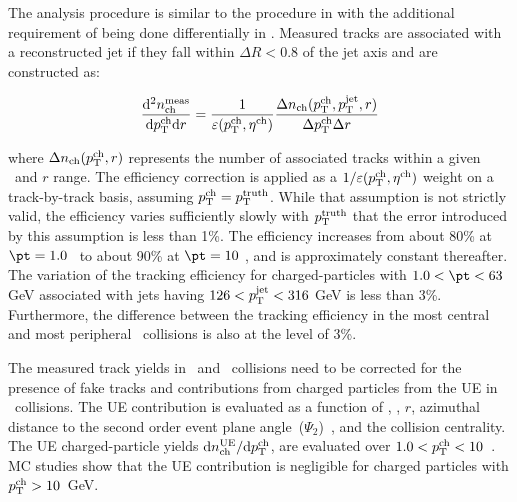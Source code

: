 
The analysis procedure is similar to the procedure in \cite{PhysRevC.98.024908} with the additional requirement of being done differentially in \rvar. Measured tracks are associated with a reconstructed jet if they fall within $\Delta R < 0.8$ of the jet axis and are constructed as:

\begin{eqnarray}
\dfrac{\mathrm{d}^{2} \mbox{$n_{\mathrm{ch}}^{\mathrm{meas}}$} }{ \mathrm{d} \mbox{$p_{\mathrm{T}}^{\mathrm{ch}}$} \mathrm{d} r} = \frac{1}{\varepsilon(\mbox{$p_{\mathrm{T}}^{\mathrm{ch}}$},\mbox{$\eta^{\mathrm{ch}}$})} \frac{\Delta \mbox{$n_{\mathrm{ch}}$}(\mbox{$p_{\mathrm{T}}^{\mathrm{ch}}$},\mbox{$p_{\mathrm{T}}^{\mathrm{jet}}$},r)}{\Delta\mbox{$p_{\mathrm{T}}^{\mathrm{ch}}$} \Delta r}
\end{eqnarray}

where $\Delta \mbox{$n_{\mathrm{ch}}$} (\mbox{$p_{\mathrm{T}}^{\mathrm{ch}}$},r)$ represents the number of associated tracks within a given \pttrk\ and $r$ range. The efficiency correction is applied as a $1/\varepsilon(\mbox{$p_{\mathrm{T}}^{\mathrm{ch}}$},\mbox{$\eta^{\mathrm{ch}}$})$ weight on a track-by-track basis, assuming $\mbox{$p_{\mathrm{T}}^{\mathrm{ch}}$} = \mbox{$p_{\mathrm{T}}^{\mathrm{truth}}$}$. While that assumption is not strictly valid, the efficiency varies sufficiently slowly with $\mbox{$p_{\mathrm{T}}^{\mathrm{truth}}$}$ that the error
introduced by this assumption is less than 1\%. The efficiency increases from about 80\% at \mbox{$ \pt = 1.0$ \GeV} to about 90\% at $ \pt = 10 $ \GeV, and is approximately constant thereafter. The variation of the tracking efficiency for charged-particles with $1.0 < \pt < 63 $ GeV associated with jets having $126 < \mbox{$p_{\mathrm{T}}^{\mathrm{jet}}$} < 316$ GeV is less than 3\%. Furthermore, the difference between the tracking efficiency in the most central and most peripheral \pbpb\ collisions is also at the level of 3\%.

The measured track yields in \pp\ and \PbPb\ collisions need to be corrected for the presence of fake tracks and contributions from charged particles from the UE in \pbpb\ collisions. The UE contribution is evaluated as a function of \pttrk, \ptjet, $r$, azimuthal distance to the second order event plane angle~($\Psi_{2}$)~\cite{ATLAS:2012at}, and the collision centrality. The UE charged-particle yields $\mathrm{d} \mbox{$n_{\mathrm{ch}}^{\mathrm{UE}}$}/ \mathrm{d} \mbox{$p_{\mathrm{T}}^{\mathrm{ch}}$}$, are evaluated over \mbox{$1.0 < \mbox{$p_{\mathrm{T}}^{\mathrm{ch}}$} < 10$~\GeV}. MC studies show that the UE contribution is negligible for charged particles with $\mbox{$p_{\mathrm{T}}^{\mathrm{ch}}$}>10$~GeV.

